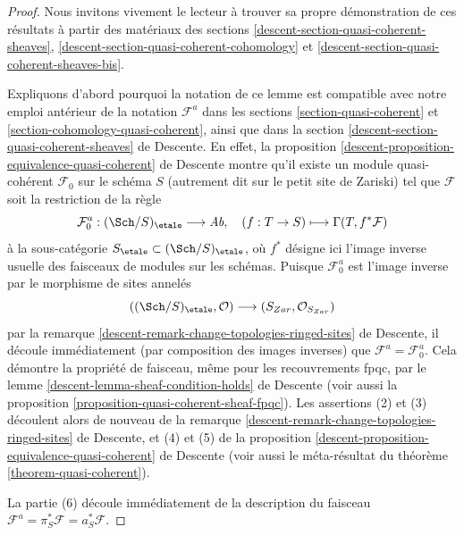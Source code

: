 \begin{proof}
Nous invitons vivement le lecteur à trouver sa propre démonstration de ces résultats
à partir des matériaux des
sections \ref{descent-section-quasi-coherent-sheaves},
\ref{descent-section-quasi-coherent-cohomology} et
\ref{descent-section-quasi-coherent-sheaves-bis}.

\medskip\noindent
Expliquons d'abord pourquoi la notation de ce lemme est compatible avec notre
emploi antérieur de la notation $\mathcal{F}^a$ dans les
sections \ref{section-quasi-coherent} et
\ref{section-cohomology-quasi-coherent},
ainsi que dans la
section \ref{descent-section-quasi-coherent-sheaves} de Descente.
En effet, la
proposition \ref{descent-proposition-equivalence-quasi-coherent} de Descente
montre qu'il existe un module quasi-cohérent
$\mathcal{F}_0$ sur le schéma $S$ (autrement dit sur le petit
site de Zariski) tel que $\mathcal{F}$ soit la restriction de la
règle
$$
\mathcal{F}_0^a : (\Sch/S)_\etale \longrightarrow \textit{Ab},\quad
(f : T \to S) \longmapsto \Gamma(T, f^*\mathcal{F})
$$
à la sous-catégorie $S_\etale \subset (\Sch/S)_\etale$,
où $f^*$ désigne ici l'image inverse usuelle des faisceaux de modules sur les schémas.
Puisque $\mathcal{F}_0^a$ est l'image inverse par le morphisme de
sites annelés
$$
((\Sch/S)_\etale, \mathcal{O}) \longrightarrow (S_{Zar}, \mathcal{O}_{S_{Zar}})
$$
par la remarque \ref{descent-remark-change-topologies-ringed-sites} de Descente,
il découle immédiatement (par composition des images inverses) que
$\mathcal{F}^a = \mathcal{F}_0^a$. Cela démontre la propriété de faisceau,
même pour les recouvrements fpqc, par le
lemme \ref{descent-lemma-sheaf-condition-holds} de Descente (voir aussi la
proposition \ref{proposition-quasi-coherent-sheaf-fpqc}).
Les assertions (2) et (3) découlent alors
de nouveau de la remarque \ref{descent-remark-change-topologies-ringed-sites} de Descente,
et (4) et (5) de la
proposition \ref{descent-proposition-equivalence-quasi-coherent} de Descente
(voir aussi le méta-résultat du
théorème \ref{theorem-quasi-coherent}).

\medskip\noindent
La partie (6) découle immédiatement de la description du faisceau
$\mathcal{F}^a = \pi_S^*\mathcal{F} = a_S^*\mathcal{F}$.


\end{proof}
